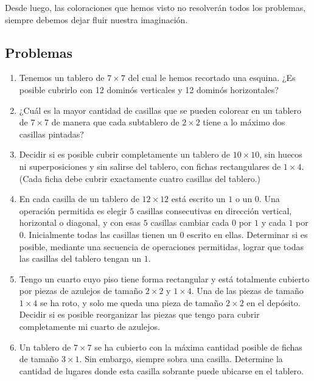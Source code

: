 Desde luego, las coloraciones que hemos visto no resolver\'an todos los problemas, siempre debemos dejar fluir nuestra imaginaci\'on.

\subsection{Problemas}

\begin{enumerate}
	\item Tenemos un tablero de $7 \times 7$ del cual le hemos recortado una esquina. ¿Es posible cubrirlo con 12 domin\'os verticales y 12 domin\'os horizontales?
	
	\item ¿Cu\'al es la mayor cantidad de casillas que se pueden colorear en un tablero de $7 \times 7 $ de manera que cada subtablero de $2 \times 2$ tiene a lo m\'aximo dos casillas pintadas?
	
	\item Decidir si es posible cubrir completamente un tablero de $10 \times 10$, sin huecos ni superposiciones y sin salirse del tablero, con fichas rectangulares de $1 \times 4$. (Cada ficha debe cubrir exactamente cuatro casillas del tablero.)
	
	\item En cada casilla de un tablero de $12 \times 12$ est\'a escrito un $1$ o un $0$. Una operaci\'on permitida es elegir $5$ casillas consecutivas en direcci\'on vertical, horizontal o diagonal, y con esas $5$ casillas cambiar cada $0$ por $1$ y cada $1$ por $0$. Inicialmente todas las casillas tienen un $0$ escrito en ellas. Determinar si es posible, mediante una secuencia de operaciones permitidas, lograr que todas las casillas del tablero tengan un $1$.
	
	\item Tengo un cuarto cuyo piso tiene forma rectangular y est\'a totalmente cubierto por piezas de azulejos de tamaño $2 \times 2$ y $1\times 4$. Una de las piezas de tamaño $1\times 4$ se ha roto, y solo me queda una pieza de tamaño $2\times 2$ en el dep\'osito. Decidir si es posible reorganizar las piezas que tengo para cubrir completamente mi cuarto de azulejos.
	
	\item Un tablero de $7 \times 7$ se ha cubierto con la m\'axima cantidad posible de fichas de tamaño $3\times 1$. Sin embargo, siempre sobra una casilla. Determine la cantidad de lugares donde esta casilla sobrante puede ubicarse en el tablero.
	

\end{enumerate}
